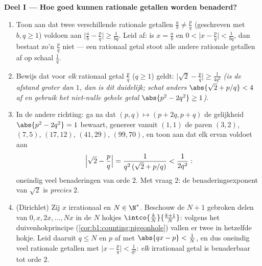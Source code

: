 \begin{problem}
\medskip
\noindent\textbf{Deel I --- Hoe goed kunnen rationale getallen
worden benaderd?}
\begin{enumerate}
  \item Toon aan dat twee verschillende rationale getallen $\frac
        ab \neq \frac pq$ (geschreven met $b, q \geq 1$) voldoen
        aan $\bigl|\frac ab - \frac pq\bigr| \geq \frac{1}{bq}$.
        Leid af: is $x = \frac ab$ en $0 < \bigl|x - \frac
        pq\bigr| < \frac{1}{bq}$, dan bestaat zo'n $\frac pq$
        niet --- een rationaal getal stoot alle andere rationale
        getallen af op schaal $\frac 1q$.
  \item Bewijs dat voor \emph{elk} rationaal getal $\frac pq$ ($q
        \geq 1$) geldt: $\bigl|\sqrt2 - \frac pq\bigr| \geq
        \frac{1}{4q^2}$ \emph{(is de afstand groter dan $1$, dan
        is dit duidelijk; schat anders $\abs{\sqrt2 + p/q} < 4$
        af en gebruik het niet-nulle gehele getal $\abs{p^2 -
        2q^2} \geq 1$)}.
  \item In de andere richting: ga na dat $(p, q) \mapsto (p + 2q,
        p + q)$ de gelijkheid $\abs{p^2 - 2q^2} = 1$ bewaart,
        genereer vanuit $(1,1)$ de paren $(3,2)$, $(7,5)$,
        $(17,12)$, $(41,29)$, $(99,70)$, en toon aan dat elk
        ervan voldoet aan
        \[
        \Bigl|\sqrt2 - \frac pq\Bigr| =
        \frac{1}{q^2\,(\sqrt2 + p/q)} < \frac{1}{2q^2} :
        \]
        oneindig veel benaderingen van orde $2$. Met vraag 2: de
        benaderingsexponent van $\sqrt 2$ is \emph{precies} $2$.
  \item (Dirichlet) Zij $x$ irrationaal en $N \in \N^*$. Beschouw
        de $N + 1$ gebroken delen van $0, x, 2x, \dots, Nx$ in de
        $N$ hokjes $\intco{\frac kN}{\frac{k + 1}{N}}$: volgens
        het duivenhokprincipe
        (\cref{cor:b1:counting:pigeonhole}) vallen er twee in
        hetzelfde hokje. Leid daaruit $q \leq N$ en $p$ af met
        $\abs{qx - p} < \frac 1N$, en dus oneindig veel rationale
        getallen met $\bigl|x - \frac pq\bigr| < \frac{1}{q^2}$:
        \emph{elk} irrationaal getal is benaderbaar tot orde $2$.
\end{enumerate}


\end{problem}
